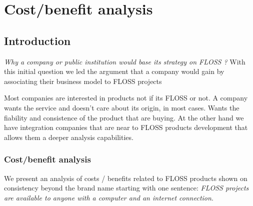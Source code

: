 \chapter{Cost/benefit analysis}

\section{Introduction}

\emph{Why a company or public institution would base its strategy on FLOSS ?} With this initial question we led the argument that a company would gain by associating their business model to FLOSS projects 

Most companies are interested in products not if its FLOSS or not. A company wants the service and doesn't care about its origin, in most cases. Wants the fiability and consistence of the product that are buying. At the other hand we have integration companies that are near to FLOSS products development that allows them a deeper analysis capabilities.

\subsection{Cost/benefit analysis}

We present an analysis of costs / benefits related to FLOSS products shown on consistency beyond the brand name starting with one sentence: \emph{FLOSS projects are available to anyone with a computer and an internet connection}.

